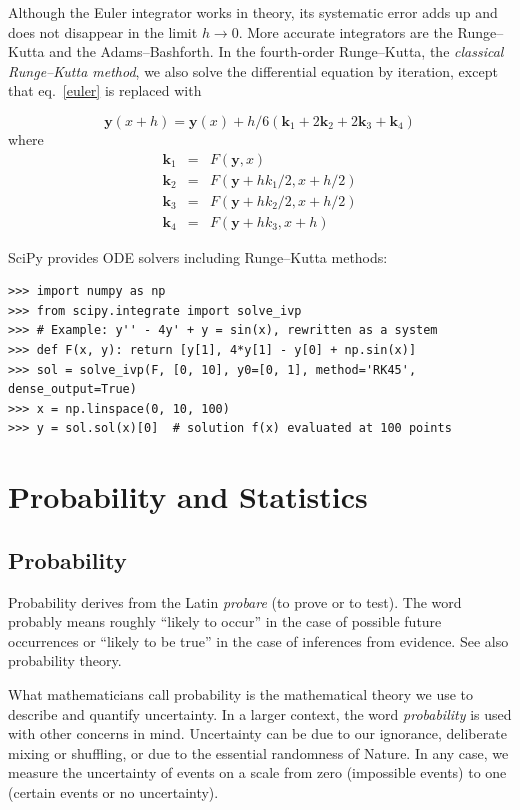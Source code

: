\documentclass[justified, sixbynine]{tufte-book}
\theoremstyle{plain}%
\newtheorem * {corollary}{Corollary}
\theoremstyle{definition}
\theoremstyle{remark}
\newtheorem * {remark}{Remark}
\newtheorem * {note}{Note}
\begin{document}
\begin{fullwidth}
 Although the Euler integrator works in theory, its systematic error adds up and does not disappear in the limit $h\rightarrow 0$. More accurate integrators are the Runge--Kutta and the Adams--Bashforth. In the fourth-order Runge--Kutta, the {\it classical Runge--Kutta method}, we also solve the differential equation by iteration, except that eq.~\ref{euler} is replaced with

\begin{equation}
\mathbf{y}(x+h) = \mathbf{y}(x) + h/6 (\mathbf{k}_1+2\mathbf{k}_2+2\mathbf{k}_3+\mathbf{k}_4)\label{rungekatta}
\end{equation}
where
\begin{eqnarray}
\mathbf{k}_1 &=& F(\mathbf{y}, x) \\
\mathbf{k}_2 &=& F(\mathbf{y}+h k_1/2, x+h/2) \\
\mathbf{k}_3 &=& F(\mathbf{y}+h k_2/2, x+h/2) \\
\mathbf{k}_4 &=& F(\mathbf{y}+h k_3, x+h)
\end{eqnarray}

SciPy provides ODE solvers including Runge--Kutta methods:

\begin{lstlisting}
>>> import numpy as np
>>> from scipy.integrate import solve_ivp
>>> # Example: y'' - 4y' + y = sin(x), rewritten as a system
>>> def F(x, y): return [y[1], 4*y[1] - y[0] + np.sin(x)]
>>> sol = solve_ivp(F, [0, 10], y0=[0, 1], method='RK45', dense_output=True)
>>> x = np.linspace(0, 10, 100)
>>> y = sol.sol(x)[0]  # solution f(x) evaluated at 100 points
\end{lstlisting}

\chapter{Probability and Statistics}

\goodbreak\section{Probability}


Probability derives from the Latin {\it probare} (to prove or to test). The word
probably means roughly ``likely to occur'' in the case of possible future
occurrences or ``likely to be true'' in the case of inferences from
evidence. See also probability theory.

What mathematicians call probability is the mathematical theory we use to
describe and quantify uncertainty. In a larger context, the word {\it probability}
is used with other concerns in mind. Uncertainty can be due to our
ignorance, deliberate mixing or shuffling, or due to the essential
randomness of Nature. In any case, we measure the uncertainty of events on a
scale from zero (impossible events) to one (certain events or no
uncertainty).


\end{fullwidth}
\end{document}
